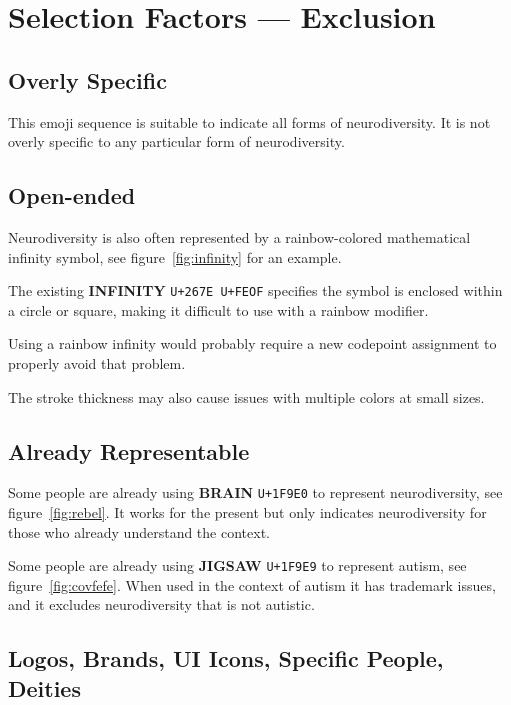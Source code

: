 \section{Selection Factors --- Exclusion}

\setcounter{subsection}{5}

\subsection{Overly Specific}

This emoji sequence is suitable to indicate all forms of neurodiversity. It is not
overly specific to any particular form of neurodiversity.

\subsection{Open-ended}

Neurodiversity is also often represented by a rainbow-colored mathematical infinity
symbol, see figure~\ref{fig:infinity} for an example.

The existing \textbf{INFINITY} \texttt{U+267E U+FEOF} specifies the symbol is enclosed
within a circle or square, making it difficult to use with a rainbow modifier.

Using a rainbow infinity would probably require a new codepoint assignment to properly avoid that problem.

The stroke thickness may also cause issues with multiple colors at small sizes.

\subsection{Already Representable}

Some people are already using \textbf{BRAIN} \texttt{U+1F9E0} to represent neurodiversity, see
figure~\ref{fig:rebel}. It works for the present but only indicates neurodiversity for those
who already understand the context.

Some people are already using \textbf{JIGSAW} \texttt{U+1F9E9} to represent autism, see
figure~\ref{fig:covfefe}. When used in the context of autism it has trademark issues, and it
excludes neurodiversity that is not autistic.

\subsection{Logos, Brands, UI Icons, Specific People, Deities}

